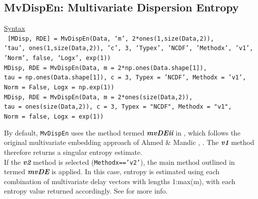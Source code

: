 \documentclass[12pt, a4paper, titlepage, openany]{book}
\begin{document}
\newpage
\subsection{\normalsize MvDispEn: \hspace{15mm} Multivariate Dispersion Entropy} \label{MvDispEn}
\noindent\ul{Syntax} \vspace{6mm} \\ \noindent \texttt{\footnotesize
[MDisp, RDE] = MvDispEn(Data, ‘m’, 2*ones(1,size(Data,2)),  \\ \indent ‘tau’, ones(1,size(Data,2)), 'c', 3, ‘Typex’, 'NCDF', 'Methodx', 'v1', \\ \indent 'Norm', false, ‘Logx’, exp(1))\\
 MDisp, RDE  = MvDispEn(Data, m = 2*np.ones(Data.shape[1]),  \\ \indent  tau = np.ones(Data.shape[1]), c = 3, Typex = 'NCDF', Methodx = 'v1', \\ \indent Norm = False, Logx = np.exp(1))\\
 MDisp, RDE  = MvDispEn(Data, m = 2*ones(size(Data,2)),   \\ \indent  tau = ones(size(Data,2)), c = 3, Typex = "NCDF", Methodx = "v1", \\ \indent Norm = false, Logx = exp(1))} 
 
\begin{tcolorbox}[colback=ehone!5, colframe=ehtwo!, title=\hypertarget{bidinote}{\textbf{IMPORTANT}}, label={BiBox}]
By default, \texttt{MvDispEn} uses the method termed  \textit{\textbf{mvDEii}} in \cite{MvDisp1}, which follows the original multivariate embedding approach of Ahmed \& Mandic \cite{MvSamp1}, \cite{MvSamp2}. The \textit{\textbf{v1}} method therefore returns a singular entropy estimate.\\ \newline
If the \textit{\textbf{v2}} method is selected (\texttt{Methodx=='v2'}), the main method outlined in \cite{MvDisp1} termed \textit{\textbf{mvDE}} is applied. In this case, entropy is estimated using each combination of multivariate delay vectors with lengths 1:max(m), with each entropy value returned accordingly. See \cite{MvDisp1} for more info.
\end{tcolorbox}
 
\end{document}
